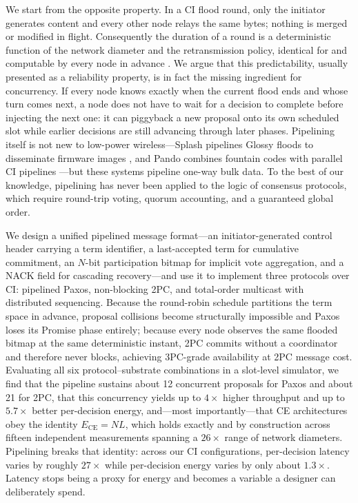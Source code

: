 \documentclass[journal]{IEEEtran}
\newcommand{\CI}{CI}                      %
\newcommand{\CE}{CE}                      %
\newcommand{\Nnodes}{N}                   %
\newcommand{\Ece}{E_{\mathrm{CE}}}        %
\begin{document}
We start from the opposite property. In a \CI{} flood round, only the
initiator generates content and every other node relays the same bytes;
nothing is merged or modified in flight. Consequently the duration of a
round is a deterministic function of the network diameter and the
retransmission policy, identical for and computable by every node in
advance \cite{alnahas19blueflood}. We argue that this predictability,
usually presented as a reliability property, is in fact the missing
ingredient for concurrency. If every node knows exactly when the current
flood ends and whose turn comes next, a node does not have to wait for a
decision to complete before injecting the next one: it can piggyback a new
proposal onto its own scheduled slot while earlier decisions are still
advancing through later phases. Pipelining itself is not new to low-power
wireless---Splash pipelines Glossy floods to disseminate firmware images
\cite{doddavenkatappa13splash}, and Pando combines fountain codes with
parallel \CI{} pipelines \cite{du17pando}---but these systems pipeline
one-way bulk data. To the best of our knowledge, pipelining has never been
applied to the logic of consensus protocols, which require round-trip
voting, quorum accounting, and a guaranteed global order.

We design a unified pipelined message format---an initiator-generated
control header carrying a term identifier, a last-accepted term for
cumulative commitment, an $\Nnodes$-bit participation bitmap for implicit
vote aggregation, and a NACK field for cascading recovery---and use it to
implement three protocols over \CI: pipelined Paxos, non-blocking 2PC, and
total-order multicast with distributed sequencing. Because the round-robin
schedule partitions the term space in advance, proposal collisions become
structurally impossible and Paxos loses its Promise phase entirely; because
every node observes the same flooded bitmap at the same deterministic
instant, 2PC commits without a coordinator and therefore never blocks,
achieving 3PC-grade availability \cite{skeen81nonblocking} at 2PC message
cost. Evaluating all six protocol--substrate combinations in a slot-level
simulator, we find that the pipeline sustains about 12 concurrent proposals
for Paxos and about 21 for 2PC, that this concurrency yields up to
$4\times$ higher throughput and up to $5.7\times$ better
per-decision energy, and---most importantly---that \CE{} architectures obey
the identity $\Ece = \Nnodes L$, which holds exactly and by construction
across fifteen independent measurements spanning a $26\times$ range of network
diameters. Pipelining breaks that identity: across our \CI{} configurations,
per-decision latency varies by roughly $27\times$ while per-decision energy
varies by only about $1.3\times$. Latency stops being a proxy for energy
and becomes a variable a designer can deliberately spend.
\end{document}
